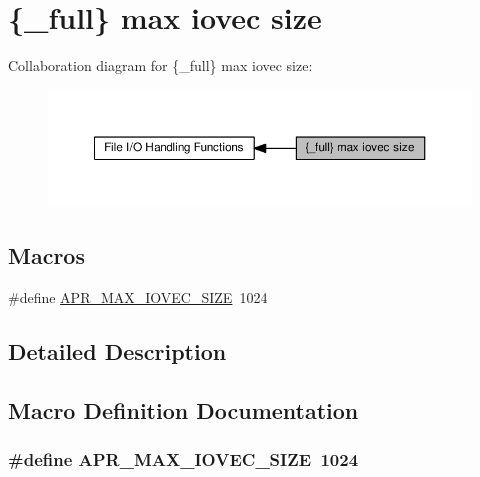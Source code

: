 \hypertarget{group__apr__file__writev}{}\section{\{\+\_\+full\} max iovec size}
\label{group__apr__file__writev}
Collaboration diagram for \{\+\_\+full\} max iovec size\+:
\nopagebreak
\begin{figure}[H]
\begin{center}
\leavevmode
\includegraphics[width=350pt]{group__apr__file__writev}
\end{center}
\end{figure}
\subsection*{Macros}
\begin{DoxyCompactItemize}
\item 
\#define \hyperlink{group__apr__file__writev_gae04a4721139b2b252ea20e68883da4b4}{A\+P\+R\+\_\+\+M\+A\+X\+\_\+\+I\+O\+V\+E\+C\+\_\+\+S\+I\+ZE}~1024
\end{DoxyCompactItemize}


\subsection{Detailed Description}


\subsection{Macro Definition Documentation}
\subsubsection[{\texorpdfstring{A\+P\+R\+\_\+\+M\+A\+X\+\_\+\+I\+O\+V\+E\+C\+\_\+\+S\+I\+ZE}{APR_MAX_IOVEC_SIZE}}]{\setlength{\rightskip}{0pt plus 5cm}\#define A\+P\+R\+\_\+\+M\+A\+X\+\_\+\+I\+O\+V\+E\+C\+\_\+\+S\+I\+ZE~1024}\hypertarget{group__apr__file__writev_gae04a4721139b2b252ea20e68883da4b4}{}\label{group__apr__file__writev_gae04a4721139b2b252ea20e68883da4b4}
